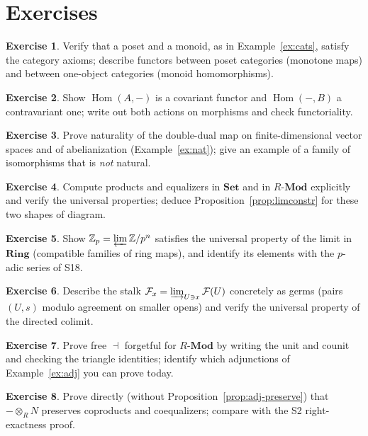 \documentclass[11pt,a4paper]{article}
\theoremstyle{definition}
\newtheorem{exercise}{Exercise}
\newcommand{\Z}{\mathbb{Z}}
\newcommand{\Hom}{\operatorname{Hom}}
\newcommand{\Set}{\mathbf{Set}}
\newcommand{\Ring}{\mathbf{Ring}}
\begin{document}
\section{Exercises}
\begin{exercise}
Verify that a poset and a monoid, as in Example~\ref{ex:cats}, satisfy the category axioms; describe
functors between poset categories (monotone maps) and between one-object categories (monoid
homomorphisms).
\end{exercise}
\begin{exercise}
Show $\Hom(A,-)$ is a covariant functor and $\Hom(-,B)$ a contravariant one; write out both actions
on morphisms and check functoriality.
\end{exercise}
\begin{exercise}
Prove naturality of the double-dual map on finite-dimensional vector spaces and of abelianization
(Example~\ref{ex:nat}); give an example of a family of isomorphisms that is \emph{not} natural.
\end{exercise}
\begin{exercise}
Compute products and equalizers in $\Set$ and in $R\text{-}\mathbf{Mod}$ explicitly and verify the
universal properties; deduce Proposition~\ref{prop:limconstr} for these two shapes of diagram.
\end{exercise}
\begin{exercise}
Show $\Z_p=\varprojlim \Z/p^n$ satisfies the universal property of the limit in $\Ring$ (compatible
families of ring maps), and identify its elements with the $p$-adic series of S18.
\end{exercise}
\begin{exercise}
Describe the stalk $\mathcal F_x=\varinjlim_{U\ni x}\mathcal F(U)$ concretely as germs (pairs
$(U,s)$ modulo agreement on smaller opens) and verify the universal property of the directed colimit.
\end{exercise}
\begin{exercise}
Prove free $\dashv$ forgetful for $R\text{-}\mathbf{Mod}$ by writing the unit and counit and checking
the triangle identities; identify which adjunctions of Example~\ref{ex:adj} you can prove today.
\end{exercise}
\begin{exercise}
Prove directly (without Proposition~\ref{prop:adj-preserve}) that $-\otimes_R N$ preserves coproducts
and coequalizers; compare with the S2 right-exactness proof.
\end{exercise}
\end{document}
